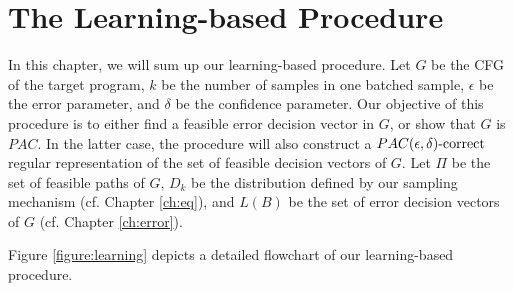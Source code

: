 \chapter{The Learning-based Procedure}\label{ch:learning_proc}

In this chapter, we will sum up our learning-based procedure. Let $G$ be the CFG of the target program, $k$ be the number of samples in one batched sample, $\epsilon$ be the error parameter, and $\delta$ be the confidence parameter. Our objective of this procedure is to either find a feasible error decision vector in $G$, or show that $G$ is $PAC$. In the latter case, the procedure will also construct a $PAC(\epsilon, \delta)\text{-correct}$ regular representation of the set of feasible decision vectors of $G$. Let $\Pi$ be the set of feasible paths of $G$, $D_k$ be the distribution defined by our sampling mechanism (cf. Chapter \ref{ch:eq}), and $L(B)$ be the set of error decision vectors of $G$ (cf. Chapter \ref{ch:error}).

Figure \ref{figure:learning} depicts a detailed flowchart of our learning-based procedure. 

